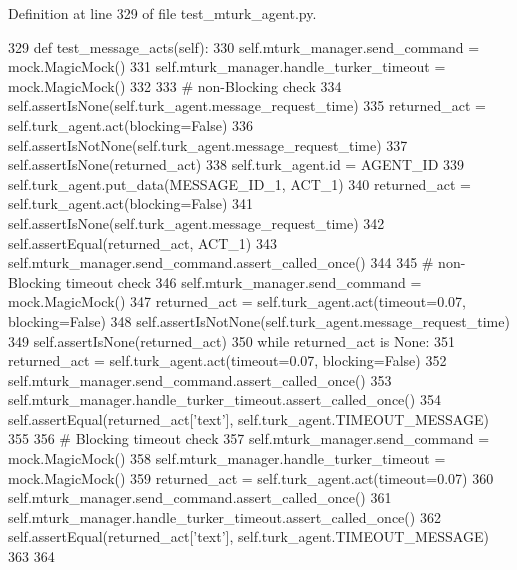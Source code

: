 Definition at line 329 of file test\+\_\+mturk\+\_\+agent.\+py.


\begin{DoxyCode}
329     \textcolor{keyword}{def }test\_message\_acts(self):
330         self.mturk\_manager.send\_command = mock.MagicMock()
331         self.mturk\_manager.handle\_turker\_timeout = mock.MagicMock()
332 
333         \textcolor{comment}{# non-Blocking check}
334         self.assertIsNone(self.turk\_agent.message\_request\_time)
335         returned\_act = self.turk\_agent.act(blocking=\textcolor{keyword}{False})
336         self.assertIsNotNone(self.turk\_agent.message\_request\_time)
337         self.assertIsNone(returned\_act)
338         self.turk\_agent.id = AGENT\_ID
339         self.turk\_agent.put\_data(MESSAGE\_ID\_1, ACT\_1)
340         returned\_act = self.turk\_agent.act(blocking=\textcolor{keyword}{False})
341         self.assertIsNone(self.turk\_agent.message\_request\_time)
342         self.assertEqual(returned\_act, ACT\_1)
343         self.mturk\_manager.send\_command.assert\_called\_once()
344 
345         \textcolor{comment}{# non-Blocking timeout check}
346         self.mturk\_manager.send\_command = mock.MagicMock()
347         returned\_act = self.turk\_agent.act(timeout=0.07, blocking=\textcolor{keyword}{False})
348         self.assertIsNotNone(self.turk\_agent.message\_request\_time)
349         self.assertIsNone(returned\_act)
350         \textcolor{keywordflow}{while} returned\_act \textcolor{keywordflow}{is} \textcolor{keywordtype}{None}:
351             returned\_act = self.turk\_agent.act(timeout=0.07, blocking=\textcolor{keyword}{False})
352         self.mturk\_manager.send\_command.assert\_called\_once()
353         self.mturk\_manager.handle\_turker\_timeout.assert\_called\_once()
354         self.assertEqual(returned\_act[\textcolor{stringliteral}{'text'}], self.turk\_agent.TIMEOUT\_MESSAGE)
355 
356         \textcolor{comment}{# Blocking timeout check}
357         self.mturk\_manager.send\_command = mock.MagicMock()
358         self.mturk\_manager.handle\_turker\_timeout = mock.MagicMock()
359         returned\_act = self.turk\_agent.act(timeout=0.07)
360         self.mturk\_manager.send\_command.assert\_called\_once()
361         self.mturk\_manager.handle\_turker\_timeout.assert\_called\_once()
362         self.assertEqual(returned\_act[\textcolor{stringliteral}{'text'}], self.turk\_agent.TIMEOUT\_MESSAGE)
363 
364 
\end{DoxyCode}
\mbox{\label{classparlai_1_1mturk_1_1core_1_1legacy__2018_1_1test_1_1test__mturk__agent_1_1TestMTurkAgent_a6ff1c8e1a13eba40115b08e7d1267de1}} 
